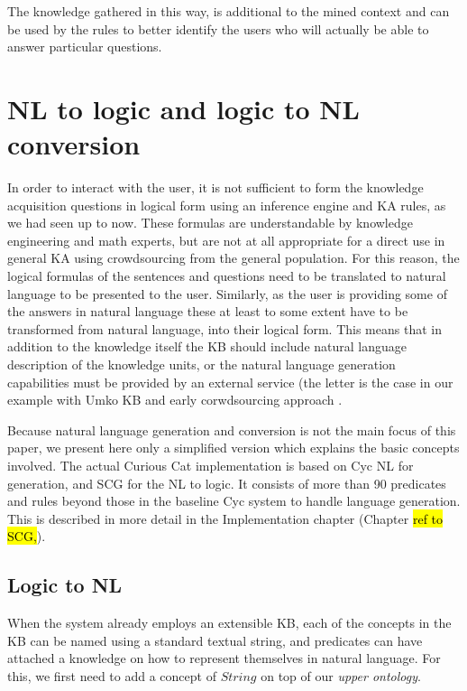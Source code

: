 The knowledge gathered in this way, is additional to the mined context and can 
be used by the rules to better identify the users who will actually be able to 
answer particular questions.

\section{NL to logic and logic to NL conversion}
\label{section:nl}
In order to interact with the user, it is not sufficient to form the knowledge 
acquisition questions in logical form using an inference engine and KA rules,
as we had seen up to now. These formulas are understandable by knowledge 
engineering and math experts, but are not at all appropriate for a direct use 
in general KA using crowdsourcing from the general population. For this reason,
the logical formulas of the sentences and questions need to be translated to 
natural language to be presented to the user. Similarly, as the user is 
providing some of the answers in natural language these at least to some extent
have to be transformed from natural language, into their logical form.
This means that in addition to the knowledge itself the KB should include 
natural language description of the knowledge units, or the natural language 
generation capabilities must be provided by an external service (the letter is 
the case in our example with Umko KB \parencite{Bradesko2015} and
early corwdsourcing approach \parencite{Bradesko2012a}. 

Because natural language generation and conversion is not the main focus of 
this paper, we present here only a simplified version which explains the basic 
concepts involved. The actual Curious Cat implementation is based on 
Cyc NL\parencite{Baxter2005} for generation, and SCG\parencite{Schneider2015}
for the NL to logic. It consists of more than 90 predicates and rules beyond 
those in the baseline Cyc system to handle language generation. This is 
described in more detail in the Implementation chapter (Chapter \hl{ref to
SCG,}).

\subsection{Logic to NL}
\label{section:logicNL}
When the system already employs an extensible KB, each of the concepts in the 
KB can be named using a standard textual string, and predicates can have 
attached a knowledge on how to represent themselves in natural language. For 
this, we first need to add a concept of $String$ on top of our 
\emph{upper ontology}.

